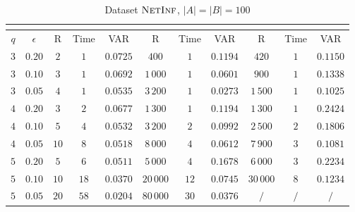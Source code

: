 	\begin{table}[h]
		\centering
		\label{my-label}
		\begin{tabular}{|c|c|c|c|c|c|c|c|c|c|c|}
			\cline{3-11}
			\multicolumn{2}{c|}{} & \multicolumn{3}{c|}{\fcount} & \multicolumn{3}{c|}{\fsamp} & \multicolumn{3}{c|}{\base}\\
			\hline	
			$q$ & $\epsilon$ & R    & Time & VAR          &  R        & Time & VAR   &        R & Time & VAR    \\ \hline
			$3$ & $0.20$     &  $2$ & $1$  & $0.0725$ &     $400$ &  $1$ & $0.1194$ &     $420$ & $1$  & $0.1150$   \\ \hline
			$3$ & $0.10$     &  $3$ & $1$  & $0.0692$ &  $1\,000$ &  $1$ & $0.0601$ &     $900$ & $1$  & $0.1338$   \\ \hline
			$3$ & $0.05$     &  $4$ & $1$  & $0.0535$ &  $3\,200$ &  $1$ & $0.0273$ &  $1\,500$ & $1$  & $0.1025$   \\ \hline
		 	\hline
			$4$ & $0.20$     &  $3$ & $2$  & $0.0677$ &  $1\,300$ &  $1$ & $0.1194$ &  $1\,300$ & $1$  & $0.2424$   \\ \hline
			$4$ & $0.10$     &  $5$ & $4$  & $0.0532$ &  $3\,200$ &  $2$ & $0.0992$ &  $2\,500$ & $2$  & $0.1806$   \\ \hline
			$4$ & $0.05$     & $10$ & $8$  & $0.0518$ &  $8\,000$ &  $4$ & $0.0612$ &  $7\,900$ & $3$  & $0.1081$   \\ \hline
			\hline
			$5$ & $0.20$     &  $5$ & $6$  & $0.0511$ &  $5\,000$ &  $4$ & $0.1678$ &  $6\,000$ & $3$  & $0.2234$   \\ \hline
			$5$ & $0.10$     & $10$ & $18$ & $0.0370$ & $20\,000$ & $12$ & $0.0745$ & $30\,000$ & $8$  & $0.1234$   \\ \hline
			$5$ & $0.05$     & $20$ & $58$ & $0.0204$ & $80\,000$ & $30$ & $0.0376$ &       $/$ & $/$  & $/$   \\ \hline

		\end{tabular}
		\caption{Dataset $\textsc{NetInf}$, $|A| = |B| = 100$}
	\end{table}
